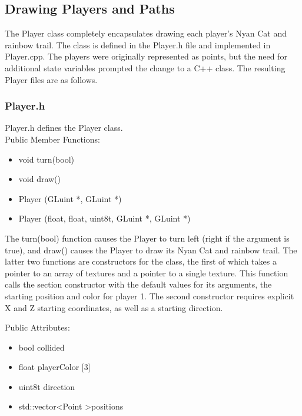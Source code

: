 \documentclass[12pt]{article}
\begin{document}
\subsection{Drawing Players and Paths}

The Player class completely encapsulates drawing each player's Nyan Cat and rainbow trail.  The class is defined in the Player.h file and implemented in Player.cpp.  The players were originally represented as points, but the need for additional state variables prompted the change to a C++ class.  The resulting Player files are as follows.

\subsubsection{Player.h}
Player.h defines the Player class.\\

\indent Public Member Functions:
\begin{itemize}
\item void turn(bool)
\item void draw()
\item Player (GLuint *, GLuint *)
\item Player (float, float, uint8\textunderscore t, GLuint *, GLuint *)
\end{itemize}

The turn(bool) function causes the Player to turn left (right if the argument is true), and draw() causes the Player to draw its Nyan Cat and rainbow trail.  The latter two functions are constructors for the class, the first of which takes a pointer to an array of textures and a pointer to a single texture.  This function calls the section constructor with the default values for its arguments, the starting position and color for player 1.  The second constructor requires explicit X and Z starting coordinates, as well as a starting direction.

\vspace{5 mm}
\indent Public Attributes:

\begin{itemize}
\item bool collided
\item float playerColor [3]
\item uint8\textunderscore t direction
\item std::vector\textless Point \textgreater positions
\end{itemize}
\end{document}
